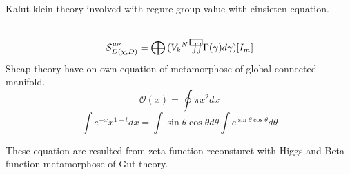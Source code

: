 \documentclass{jsarticle}
\begin{document}
Kalut-klein theory involved with regure group value with einsieten equation.
$$  \mathcal{S}^{\mu\nu}_{D(\chi,D)} = \bigoplus {(V_{k}{}^{N}\squareiint
\Gamma(\gamma)d\gamma)}[I_m] $$
Sheap theory have on own equation of metamorphose of global connected manifold.
$$ \mathcal{O}(x) = \oint \pi x^2 dx $$
$$ \int e^{-x}x^{1-t}dx = \int \sin \theta \cos \theta d \theta \int e^{\sin \theta \cos \theta}d\theta $$

 These equation are resulted from zeta function reconsturct with Higgs and
 Beta function metamorphose of Gut theory.
\end{document}
